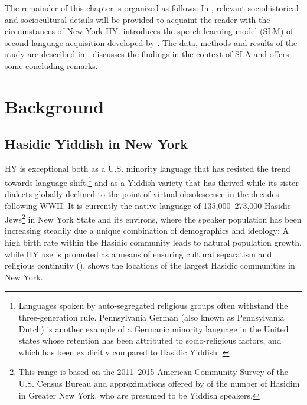 \documentclass[output=paper]{langsci/langscibook}
\begin{document}
The remainder of this chapter is organized as follows: In , relevant sociohistorical and sociocultural details will be provided to acquaint the reader with the circumstances of New York HY.  introduces the speech learning model (SLM) of second language acquisition developed by \citet{Flege1995, Flege1996}. The data, methods and results of the study are described in .  discusses the findings in the context of SLA and offers some concluding remarks.  

\section{Background}
\label{sec:nove:2}


\subsection{Hasidic Yiddish in New York}
\label{sec:nove:2.1}

HY is exceptional both as a U.S. minority language that has resisted the trend towards language shift,\footnote{Languages spoken by auto-segregated religious groups often withstand the three-generation rule. Pennsylvania German (also known as Pennsylvania Dutch) is another example of a Germanic minority language in the United states whose retention has been attributed to socio-religious factors, and which has been explicitly compared to Hasidic Yiddish \citep{Louden2016}.} and as a Yiddish variety that has thrived while its sister dialects globally declined to the point of virtual obsolescence in the decades following WWII. It is currently the native language of 135,000--273,000 Hasidic Jews\footnote{This range is based on the 2011--2015 American Community Survey of the U.S. Census Bureau \citep{MansonEtAl2017} and approximations offered by \citet{BialeEtAl2018} of the number of Hasidim in Greater New York, who are presumed to be Yiddish speakers.} in New York State and its environs, where the speaker population has been increasing steadily due a unique combination of demographics and ideology: A high birth rate within the Hasidic community leads to natural population growth, while HY use is promoted as a means of ensuring cultural separatism and religious continuity (\citealt{Fishman1965Yiddish, Shandler2006, Fader2009, Glinert1999}).  shows the locations of the largest Hasidic communities in New York. 
\end{document}
